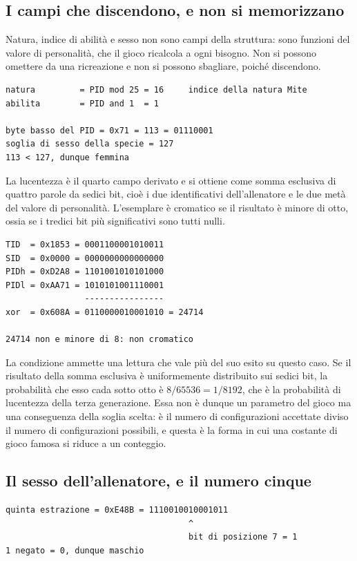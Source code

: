 \subsection*{I campi che discendono, e non si memorizzano}

Natura, indice di abilità e sesso non sono campi della struttura: sono funzioni del valore di personalità, che il gioco ricalcola a ogni bisogno. Non si possono omettere da una ricreazione e non si possono sbagliare, poiché discendono.

\begin{verbatim}
natura         = PID mod 25 = 16     indice della natura Mite
abilita        = PID and 1  = 1

byte basso del PID = 0x71 = 113 = 01110001
soglia di sesso della specie = 127
113 < 127, dunque femmina
\end{verbatim}

La lucentezza è il quarto campo derivato e si ottiene come somma esclusiva di quattro parole da sedici bit, cioè i due identificativi dell'allenatore e le due metà del valore di personalità. L'esemplare è cromatico se il risultato è minore di otto, ossia se i tredici bit più significativi sono tutti nulli.

\begin{verbatim}
TID  = 0x1853 = 0001100001010011
SID  = 0x0000 = 0000000000000000
PIDh = 0xD2A8 = 1101001010101000
PIDl = 0xAA71 = 1010101001110001
                ----------------
xor  = 0x608A = 0110000010001010 = 24714

24714 non e minore di 8: non cromatico
\end{verbatim}

La condizione ammette una lettura che vale più del suo esito su questo caso. Se il risultato della somma esclusiva è uniformemente distribuito sui sedici bit, la probabilità che esso cada sotto otto è $8/65536 = 1/8192$, che è la probabilità di lucentezza della terza generazione. Essa non è dunque un parametro del gioco ma una conseguenza della soglia scelta: è il numero di configurazioni accettate diviso il numero di configurazioni possibili, e questa è la forma in cui una costante di gioco famosa si riduce a un conteggio.

\subsection*{Il sesso dell'allenatore, e il numero cinque}

\begin{verbatim}
quinta estrazione = 0xE48B = 1110010010001011
                                     ^
                                     bit di posizione 7 = 1
1 negato = 0, dunque maschio
\end{verbatim}

